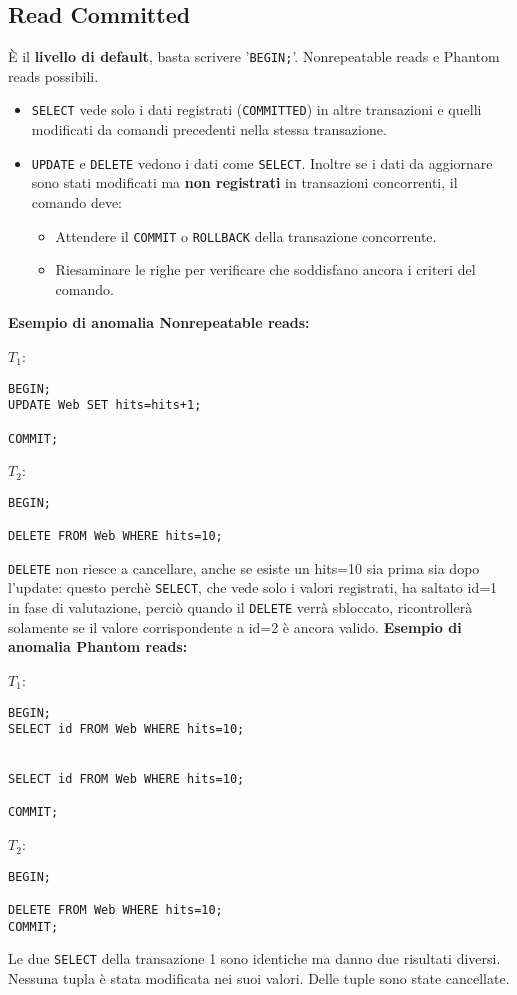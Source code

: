 \documentclass[a4paper, 10pt, titlepage]{article}
\begin{document}
		\subsection{Read Committed}
			È il \textbf{livello di default}, basta scrivere '\lstinline|BEGIN;|'. Nonrepeatable reads e Phantom reads possibili.
			\begin{itemize}
				\item \lstinline|SELECT| vede solo i dati registrati (\lstinline|COMMITTED|) in altre transazioni e quelli modificati da comandi precedenti nella stessa transazione.
				\item \lstinline|UPDATE| e \lstinline|DELETE| vedono i dati come \lstinline|SELECT|. Inoltre se i dati da aggiornare sono stati modificati ma \textbf{non registrati} in transazioni concorrenti, il comando deve:
				\begin{itemize}
					\item Attendere il \lstinline|COMMIT| o \lstinline|ROLLBACK| della transazione concorrente.
					\item Riesaminare le righe per verificare che soddisfano ancora i criteri del comando.
				\end{itemize}
			\end{itemize}
			\textbf{Esempio di anomalia Nonrepeatable reads:}
			\begin{multicols}{2}
				\noindent
				$ T_1 $:
				\begin{lstlisting}
BEGIN;
UPDATE Web SET hits=hits+1;

COMMIT;
				\end{lstlisting}
				\columnbreak
				$ T_2 $:
				\begin{lstlisting}
BEGIN;

DELETE FROM Web WHERE hits=10;

				\end{lstlisting}
			\end{multicols}
			\lstinline|DELETE| non riesce a cancellare, anche se esiste un hits=10 sia prima sia dopo l'update: questo perchè \lstinline|SELECT|, che vede solo i valori registrati, ha saltato id=1 in fase di valutazione, perciò quando il \lstinline|DELETE| verrà sbloccato, ricontrollerà solamente se il valore corrispondente a id=2 è ancora valido. 
			\newpage
\textbf{Esempio di anomalia Phantom reads:}
			\begin{multicols}{2}
				\noindent
				$ T_1 $:
				\begin{lstlisting}
BEGIN;
SELECT id FROM Web WHERE hits=10;


SELECT id FROM Web WHERE hits=10;

COMMIT;
				\end{lstlisting}
				\columnbreak
				$ T_2 $:
				\begin{lstlisting}
BEGIN;

DELETE FROM Web WHERE hits=10;
COMMIT;
				\end{lstlisting}
			\end{multicols}
			Le due \lstinline|SELECT| della transazione 1 sono identiche ma danno due risultati diversi. Nessuna tupla è stata modificata nei suoi valori. Delle tuple sono state cancellate.
			
\end{document}
